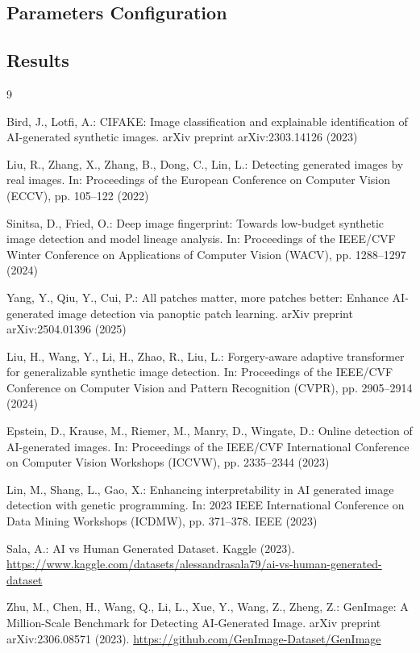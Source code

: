 \documentclass[runningheads]{llncs}
\begin{document}
\subsection{Parameters Configuration}

\subsection{Results}

\begin{thebibliography}{9}

Bird, J., Lotfi, A.: CIFAKE: Image classification and explainable identification of AI-generated synthetic images. arXiv preprint arXiv:2303.14126 (2023)

Liu, R., Zhang, X., Zhang, B., Dong, C., Lin, L.: Detecting generated images by real images. In: Proceedings of the European Conference on Computer Vision (ECCV), pp. 105--122 (2022)

Sinitsa, D., Fried, O.: Deep image fingerprint: Towards low-budget synthetic image detection and model lineage analysis. In: Proceedings of the IEEE/CVF Winter Conference on Applications of Computer Vision (WACV), pp. 1288--1297 (2024)

Yang, Y., Qiu, Y., Cui, P.: All patches matter, more patches better: Enhance AI-generated image detection via panoptic patch learning. arXiv preprint arXiv:2504.01396 (2025)

Liu, H., Wang, Y., Li, H., Zhao, R., Liu, L.: Forgery-aware adaptive transformer for generalizable synthetic image detection. In: Proceedings of the IEEE/CVF Conference on Computer Vision and Pattern Recognition (CVPR), pp. 2905--2914 (2024)

Epstein, D., Krause, M., Riemer, M., Manry, D., Wingate, D.: Online detection of AI-generated images. In: Proceedings of the IEEE/CVF International Conference on Computer Vision Workshops (ICCVW), pp. 2335--2344 (2023)

Lin, M., Shang, L., Gao, X.: Enhancing interpretability in AI generated image detection with genetic programming. In: 2023 IEEE International Conference on Data Mining Workshops (ICDMW), pp. 371--378. IEEE (2023)

Sala, A.: AI vs Human Generated Dataset. Kaggle (2023). \url{https://www.kaggle.com/datasets/alessandrasala79/ai-vs-human-generated-dataset}

Zhu, M., Chen, H., Wang, Q., Li, L., Xue, Y., Wang, Z., Zheng, Z.: GenImage: A Million-Scale Benchmark for Detecting AI-Generated Image. arXiv preprint arXiv:2306.08571 (2023). \url{https://github.com/GenImage-Dataset/GenImage}

\end{thebibliography}
\end{document}
